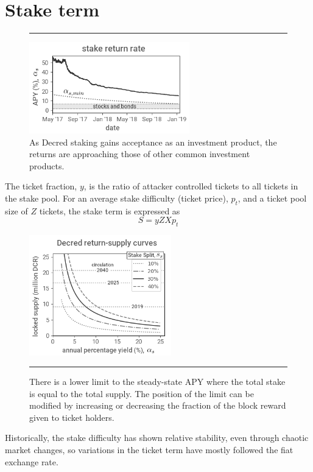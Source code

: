 \documentclass[a4paper,12pt]{article}
\begin{document}
\section{Stake term}
%
\begin{figure}[!b]
\hrule
	\vspace{5pt}
	\begin{center}
	\includegraphics[width=0.62\textwidth]{stakereturn}
\begin{minipage}[t]{0.85\textwidth}
	\caption{As Decred staking gains acceptance as an investment product, the returns are approaching those of other common investment products. \label{stakereturnfig}}
	\end{minipage}
  	\end{center}
\end{figure}
%
The ticket fraction, $y$, is the ratio of attacker controlled tickets to all tickets in the stake pool. For an average stake difficulty (ticket price), $ p_t $, and a ticket pool size of $ Z $ tickets, the stake term is expressed as 
%
\begin{equation}
S = yZXp_t
\end{equation}
%
%
\begin{figure}[h]
	\begin{center}
	\includegraphics[width=0.55\textwidth]{returnsupply}
\begin{minipage}[t]{0.85\textwidth}
	\caption{There is a lower limit to the steady-state APY where the total stake is equal to the total supply. The position of the limit can be modified by increasing or decreasing the fraction of the block reward given to ticket holders. \label{returnsupplyfig}}
	\end{minipage}
  	\end{center}
	\hrule
\end{figure}
%
Historically, the stake difficulty has shown relative stability, even through chaotic market changes, so variations in the ticket term have mostly followed the fiat exchange rate. 
\end{document}
